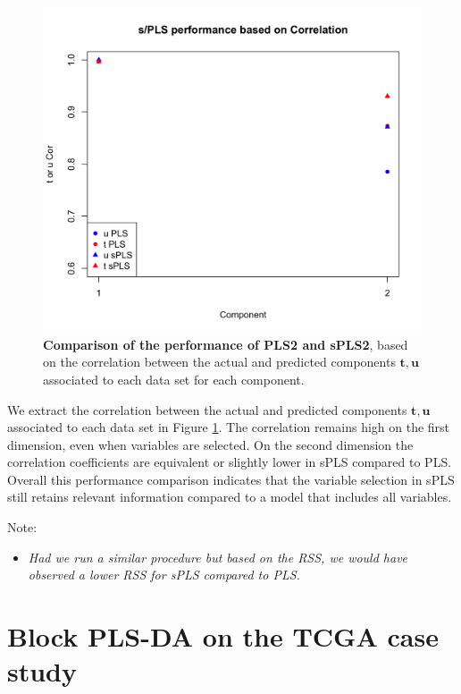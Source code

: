 \documentclass[]{book}
\providecommand{\tightlist}{%
  \setlength{\itemsep}{0pt}\setlength{\parskip}{0pt}}
\begin{document}
\begin{figure}

{\centering \includegraphics[width=0.7\linewidth]{Figures/PLS/pls-perf-spls2-1} 

}

\caption{\textbf{Comparison of the performance of PLS2 and sPLS2}, based on the correlation between the actual and predicted components \(\boldsymbol{t,u}\) associated to each data set for each component.}\label{fig:pls-perf-spls2}
\end{figure}



We extract the correlation between the actual and predicted components \(\boldsymbol{t,u}\) associated to each data set in Figure \ref{fig:pls-perf-spls2}. The correlation remains high on the first dimension, even when variables are selected. On the second dimension the correlation coefficients are equivalent or slightly lower in sPLS compared to PLS. Overall this performance comparison indicates that the variable selection in sPLS still retains relevant information compared to a model that includes all variables.

Note:

\begin{itemize}
\tightlist
\item
  \emph{Had we run a similar procedure but based on the RSS, we would have observed a lower RSS for sPLS compared to PLS.}
\end{itemize}

\hypertarget{blockplsda-tcga-case}{%
\chapter{Block PLS-DA on the TCGA case study}\label{blockplsda-tcga-case}}
\end{document}
